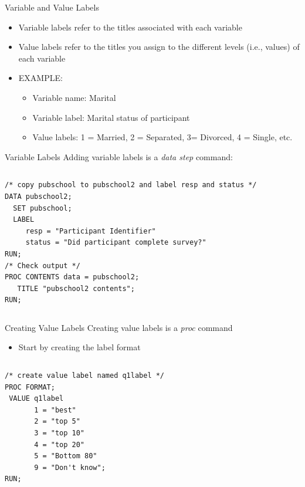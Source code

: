 \documentclass[table,smaller]{beamer}
\begin{document}
\begin{frame}[label=sec-4-1]{Variable and Value Labels}
\begin{itemize}
\item Variable labels refer to the titles associated with each variable
\item Value labels refer to the titles you assign to the different levels (i.e., values) of each variable
\item EXAMPLE:
\begin{itemize}
\item Variable name: Marital
\item Variable label: Marital status of participant
\item Value labels: 1 = Married, 2 = Separated, 3= Divorced, 4 = Single, etc.
\end{itemize}
\end{itemize}
\end{frame}
\begin{frame}[fragile,label=sec-4-2]{Variable Labels}
 Adding variable labels is a \emph{data step} command:

\vspace{-.75em} \begin{columns}  \begin{block}{}
\begin{verbatim}
/* copy pubschool to pubschool2 and label resp and status */
DATA pubschool2;
  SET pubschool;
  LABEL
     resp = "Participant Identifier"
     status = "Did participant complete survey?"
RUN;
/* Check output */
PROC CONTENTS data = pubschool2;
   TITLE "pubschool2 contents";
RUN;
\end{verbatim}
\end{block} \end{columns} \vspace{.25em}
\end{frame}
\begin{frame}[fragile,label=sec-4-3]{Creating Value Labels}
 Creating value labels is a \emph{proc} command
\begin{itemize}
\item Start by creating the label format
\end{itemize}
\vspace{-.75em} \begin{columns}  \begin{block}{}
\begin{verbatim}
/* create value label named q1label */
PROC FORMAT;
 VALUE q1label
       1 = "best"
       2 = "top 5"
       3 = "top 10"
       4 = "top 20"
       5 = "Bottom 80"
       9 = "Don't know";
RUN;
\end{verbatim}
\end{block} \end{columns} \vspace{.25em}
\end{frame}
\end{document}

